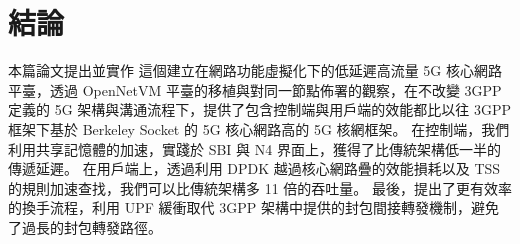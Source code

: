 \chapter{結論}
\label{chapter:conclusion}


本篇論文提出並實作 \LHCN 這個建立在網路功能虛擬化下的低延遲高流量 5G 核心網路平臺，透過 OpenNetVM 平臺的移植與對同一節點佈署的觀察，在不改變 3GPP 定義的 5G 架構與溝通流程下，提供了包含控制端與用戶端的效能都比以往 3GPP 框架下基於 Berkeley Socket 的 5G 核心網路高的 5G 核網框架。
在控制端，我們利用共享記憶體的加速，實踐於 SBI 與 N4 界面上，獲得了比傳統架構低一半的傳遞延遲。
在用戶端上，透過利用 DPDK 越過核心網路疊的效能損耗以及 TSS 的規則加速查找，我們可以比傳統架構多 11 倍的吞吐量。
最後，\LHCN 提出了更有效率的換手流程，利用 UPF 緩衝取代 3GPP 架構中提供的封包間接轉發機制，避免了過長的封包轉發路徑。
